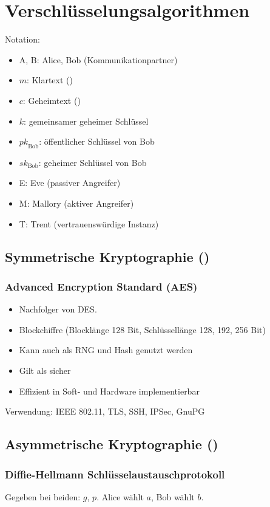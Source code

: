 \section{Verschlüsselungsalgorithmen}
Notation:
\begin{itemize}
    \item A, B: Alice, Bob (Kommunikationpartner)
    \item $m$: Klartext ()
    \item $c$: Geheimtext ()
    \item $k$: gemeinsamer geheimer Schlüssel
    \item ${pk}_\text{Bob}$: öffentlicher Schlüssel von Bob
    \item ${sk}_\text{Bob}$: geheimer Schlüssel von Bob
    \item E: Eve (passiver Angreifer)
    \item M: Mallory (aktiver Angreifer)
    \item T: Trent (vertrauenswürdige Instanz)
\end{itemize}

\subsection{Symmetrische Kryptographie ()}
\subsubsection{Advanced Encryption Standard (AES)}
\begin{itemize}
    \item Nachfolger von DES.
    \item Blockchiffre (Blocklänge 128 Bit, Schlüssellänge 128, 192, 256 Bit)
    \item Kann auch als RNG und Hash genutzt werden
    \item Gilt als sicher
    \item Effizient in Soft- und Hardware implementierbar
\end{itemize}
Verwendung: IEEE 802.11, TLS, SSH, IPSec, GnuPG

\subsection{Asymmetrische Kryptographie ()}
\subsubsection{Diffie-Hellmann Schlüsselaustauschprotokoll}
Gegeben bei beiden: $g$, $p$. Alice wählt $a$, Bob wählt $b$.

